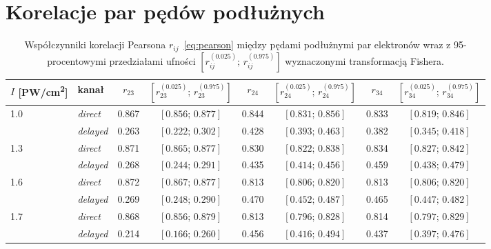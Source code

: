 \documentclass[12pt,a4paper]{article}
\newcommand{\PWcm}{PW/cm\textsuperscript{2}}
\begin{document}
\section{Korelacje par pędów podłużnych}

\begin{table}[htbp]
  \centering
  \small
  \caption{Współczynniki korelacji Pearsona $r_{ij}$~\eqref{eq:pearson}
  między pędami podłużnymi par elektronów wraz z 95-procentowymi
  przedziałami ufności $[r_{ij}^{(\num{0.025})};\,r_{ij}^{(\num{0.975})}]$
  wyznaczonymi transformacją Fishera.}
  \label{tab:korelacje}
  \begin{tabular}{llcccccc}
    \toprule
    $I$ [\PWcm] & kanał
      & $r_{23}$ & $[r_{23}^{(\num{0.025})};\,r_{23}^{(\num{0.975})}]$
      & $r_{24}$ & $[r_{24}^{(\num{0.025})};\,r_{24}^{(\num{0.975})}]$
      & $r_{34}$ & $[r_{34}^{(\num{0.025})};\,r_{34}^{(\num{0.975})}]$ \\
    \midrule
    \num{1.0} & \emph{direct}  & \num{0.867} & $[\num{0.856};\,\num{0.877}]$ & \num{0.844} & $[\num{0.831};\,\num{0.856}]$ & \num{0.833} & $[\num{0.819};\,\num{0.846}]$ \\
              & \emph{delayed} & \num{0.263} & $[\num{0.222};\,\num{0.302}]$ & \num{0.428} & $[\num{0.393};\,\num{0.463}]$ & \num{0.382} & $[\num{0.345};\,\num{0.418}]$ \\
    \midrule
    \num{1.3} & \emph{direct}  & \num{0.871} & $[\num{0.865};\,\num{0.877}]$ & \num{0.830} & $[\num{0.822};\,\num{0.838}]$ & \num{0.834} & $[\num{0.827};\,\num{0.842}]$ \\
              & \emph{delayed} & \num{0.268} & $[\num{0.244};\,\num{0.291}]$ & \num{0.435} & $[\num{0.414};\,\num{0.456}]$ & \num{0.459} & $[\num{0.438};\,\num{0.479}]$ \\
    \midrule
    \num{1.6} & \emph{direct}  & \num{0.872} & $[\num{0.867};\,\num{0.877}]$ & \num{0.813} & $[\num{0.806};\,\num{0.820}]$ & \num{0.813} & $[\num{0.806};\,\num{0.820}]$ \\
              & \emph{delayed} & \num{0.269} & $[\num{0.248};\,\num{0.290}]$ & \num{0.470} & $[\num{0.452};\,\num{0.487}]$ & \num{0.465} & $[\num{0.447};\,\num{0.482}]$ \\
    \midrule
    \num{1.7} & \emph{direct}  & \num{0.868} & $[\num{0.856};\,\num{0.879}]$ & \num{0.813} & $[\num{0.796};\,\num{0.828}]$ & \num{0.814} & $[\num{0.797};\,\num{0.829}]$ \\
              & \emph{delayed} & \num{0.214} & $[\num{0.166};\,\num{0.260}]$ & \num{0.456} & $[\num{0.416};\,\num{0.494}]$ & \num{0.437} & $[\num{0.397};\,\num{0.476}]$ \\
    \bottomrule
  \end{tabular}
\end{table}



\end{document}
